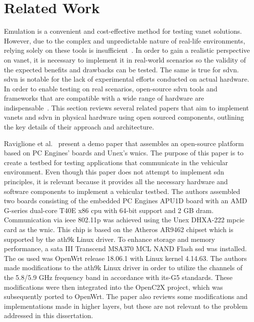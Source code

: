 \section{Related Work}
\label{sec:related_papers}

Emulation is a convenient and cost-effective method for testing \gls{vanet} solutions. However, due to the complex and unpredictable nature of real-life environments, relying solely on these tools is insufficient~\cite{cardona_software-defined_2020}. In order to gain a realistic perspective on \gls{vanet}, it is necessary to implement it in real-world scenarios so the validity of the expected benefits and drawbacks can be tested. The same is true for \gls{sdvn}. 
\gls{sdvn} is notable for the lack of experimental efforts conducted on actual hardware. In order to enable testing on real scenarios, open-source \gls{sdvn} tools and frameworks that are compatible with a wide range of hardware are indispensable~\cite{cardona_software-defined_2020}. This section reviews several related papers that aim to implement \glspl{vanet} and \gls{sdvn} in physical hardware using open sourced components, outlining the key details of their approach and architecture. 


Raviglione et al.~\cite{raviglione_open_2019} present a demo paper that assembles an open-source platform based on PC Engines' boards and Unex's \glspl{wnic}. The purpose of this paper is to create a testbed for testing applications that communicate in the vehicular environment. Even though this paper does not attempt to implement \gls{sdn} principles, it is relevant because it provides all the necessary hardware and software components to implement a vehicular testbed.
The authors assembled two boards consisting of the embedded PC Engines APU1D board with an AMD G-series dual-core T40E x86 \gls{cpu} with 64-bit support and 2 GB \gls{dram}. Communication via \gls{ieee} 802.11p was achieved using the Unex DHXA-222 \gls{mpcie} card as the \gls{wnic}. This chip is based on the Atheros AR9462 chipset which is supported by the ath9k Linux driver. To enhance storage and memory performance, a \gls{sata} III Transcend MSA370 MCL NAND Flash \gls{ssd} was installed.
The \gls{os} used was OpenWrt release 18.06.1 with Linux kernel 4.14.63. The authors made modifications to the ath9k Linux driver in order to utilize the channels of the 5.8/5.9 GHz frequency band in accordance with \gls{its}-G5 standards. These modifications were then integrated into the OpenC2X project, which was subsequently ported to OpenWrt. The paper also reviews some modifications and implementations made in higher layers, but these are not relevant to the problem addressed in this dissertation.

